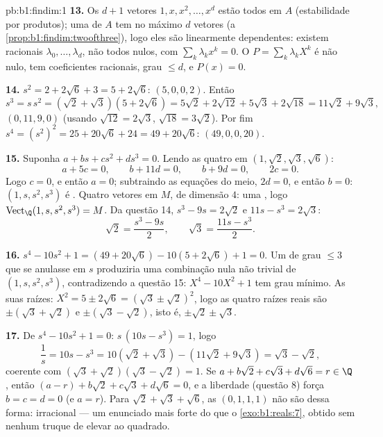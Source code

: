 \begin{solution}{pb:b1:findim:1}
\textbf{13.} Os $d + 1$ vetores $1, x, x^2, \dots, x^{d}$ estão todos em $A$
(estabilidade por produtos); uma  de $A$ tem no
máximo $d$ vetores (a \cref{prop:b1:findim:twoofthree}), logo eles são linearmente
dependentes: existem racionais $\lambda_0, \dots, \lambda_d$, não todos nulos, com $\sum_k \lambda_k x^k = 0$.
O  $P
= \sum_k \lambda_k X^k$ é não nulo, tem coeficientes racionais, grau
$\leq d$, e $P(x) = 0$.

\textbf{14.} $s^2 = 2 + 2\sqrt6 + 3 = 5 + 2\sqrt6$:  $(5, 0, 0, 2)$. Então
\[
s^3 = s\,s^2 = (\sqrt2 + \sqrt3)(5 + 2\sqrt6)
= 5\sqrt2 + 2\sqrt{12} + 5\sqrt3 + 2\sqrt{18}
= 11\sqrt2 + 9\sqrt3 ,
\]
 $(0, 11, 9, 0)$ (usando $\sqrt{12} = 2\sqrt3$, $\sqrt{18} = 3\sqrt2$). Por fim $s^4 = (s^2)^2 = 25 + 20\sqrt6 +
24 = 49 + 20\sqrt6$:
 $(49, 0, 0, 20)$.

\textbf{15.} Suponha $a + bs + cs^2 + ds^3 = 0$. Lendo as quatro  em $(1, \sqrt2, \sqrt3, \sqrt6)$:
\[
a + 5c = 0,\qquad b + 11d = 0,\qquad b + 9d = 0,\qquad 2c = 0 .
\]
Logo $c = 0$, e então $a = 0$; subtraindo as equações do meio,
$2d = 0$, e então $b = 0$: $(1, s, s^2, s^3)$ é . Quatro vetores  em
$M$, de dimensão $4$: uma , logo $\operatorname{Vect}_\Q(1, s, s^2, s^3) = M$. Da questão 14, $s^3 - 9s = 2\sqrt2$ e
$11s - s^3 = 2\sqrt3$:
\[
\sqrt2 = \frac{s^3 - 9s}{2},
\qquad
\sqrt3 = \frac{11s - s^3}{2} .
\]

\textbf{16.} $s^4 - 10s^2 + 1 = (49 + 20\sqrt6) - 10(5 +
2\sqrt6) + 1 = 0$. Um  de grau $\leq 3$ que se
anulasse em $s$ produziria uma combinação nula não trivial de
$(1, s, s^2, s^3)$, contradizendo a questão 15: $X^4 - 10X^2 + 1$ tem grau mínimo. As suas
raízes: $X^2 = 5 \pm 2\sqrt6 = (\sqrt3 \pm
\sqrt2)^2$, logo as quatro raízes reais são $\pm(\sqrt3 + \sqrt2)$ e $\pm(\sqrt3 - \sqrt2)$,
isto é, $\pm\sqrt2 \pm \sqrt3$.

\textbf{17.} De $s^4 - 10s^2 + 1 = 0$: $s\,(10s - s^3) = 1$, logo
\[
\frac1s = 10s - s^3 = 10(\sqrt2 + \sqrt3) - (11\sqrt2 + 9\sqrt3)
= \sqrt3 - \sqrt2 ,
\]
coerente com $(\sqrt3 + \sqrt2)(\sqrt3 - \sqrt2) = 1$. Se $a +
b\sqrt2 + c\sqrt3 + d\sqrt6 = r \in \Q$, então $(a - r) + b\sqrt2
+ c\sqrt3 + d\sqrt6 = 0$, e a liberdade
(questão 8) força $b = c
= d = 0$ (e $a = r$). Para $\sqrt2 + \sqrt3 + \sqrt6$, as 
$(0, 1, 1, 1)$ não são dessa forma: irracional --- um enunciado mais forte
do que o \cref{exo:b1:reals:7}, obtido sem nenhum truque de elevar ao quadrado.


\end{solution}

